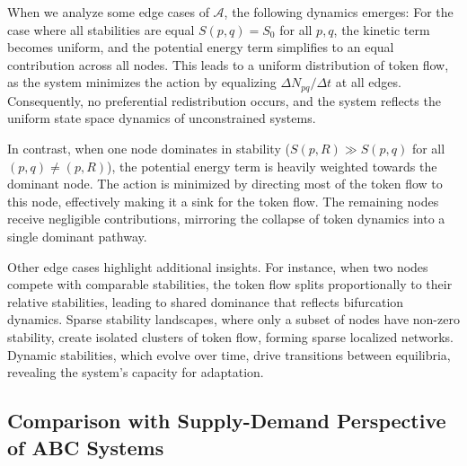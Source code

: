 \documentclass[entropy,article,submit,pdftex,oneauthor]{Definitions/mdpi}
\begin{document}
When we analyze some edge cases of \( \mathcal{A} \), the following dynamics emerges: For the case where all stabilities are equal \(S(p, q) = S_0\) for all \(p, q\), the kinetic term becomes uniform, and the potential energy term simplifies to an equal contribution across all nodes. This leads to a uniform distribution of token flow, as the system minimizes the action by equalizing \(\Delta N_{pq} / \Delta t\) at all edges. Consequently, no preferential redistribution occurs, and the system reflects the uniform state space dynamics of unconstrained systems.

In contrast, when one node dominates in stability (\(S(p, R) \gg S(p, q)\) for all \((p, q) \neq (p, R)\)), the potential energy term is heavily weighted towards the dominant node. The action is minimized by directing most of the token flow to this node, effectively making it a sink for the token flow. The remaining nodes receive negligible contributions, mirroring the collapse of token dynamics into a single dominant pathway.

Other edge cases highlight additional insights. For instance, when two nodes compete with comparable stabilities, the token flow splits proportionally to their relative stabilities, leading to shared dominance that reflects bifurcation dynamics. Sparse stability landscapes, where only a subset of nodes have non-zero stability, create isolated clusters of token flow, forming sparse localized networks. Dynamic stabilities, which evolve over time, drive transitions between equilibria, revealing the system's capacity for adaptation. 

\subsection{Comparison with Supply-Demand Perspective of ABC Systems}
\end{document}
